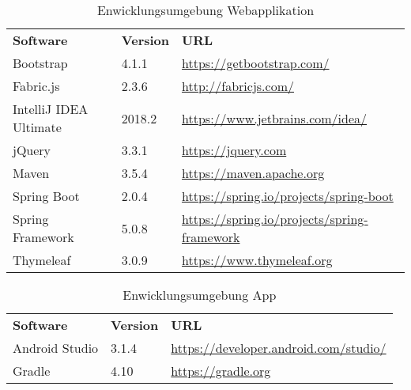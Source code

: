 \begin{table}[h]
	\centering
	\begin{tabularx}{\textwidth}{l l X}
		\rowcolor[HTML]{C0C0C0}
		\textbf{Software} & \textbf{Version} & \textbf{URL} \\
		Bootstrap & 4.1.1 &  \url{https://getbootstrap.com/} \\
		\rowcolor[HTML]{E7E7E7}
		Fabric.js & 2.3.6 &  \url{http://fabricjs.com/} \\
		IntelliJ IDEA Ultimate & 2018.2 & \url{https://www.jetbrains.com/idea/} \\		
		\rowcolor[HTML]{E7E7E7}
		jQuery & 3.3.1 &  \url{https://jquery.com} \\
		Maven & 3.5.4 & \url{https://maven.apache.org} \\
		\rowcolor[HTML]{E7E7E7}
		Spring Boot & 2.0.4 & \url{https://spring.io/projects/spring-boot} \\
		Spring Framework & 5.0.8 & \url{https://spring.io/projects/spring-framework} \\
		\rowcolor[HTML]{E7E7E7}
		Thymeleaf & 3.0.9 & \url{https://www.thymeleaf.org} \\
	\end{tabularx}
	\caption{Enwicklungsumgebung Webapplikation}
	\label{table:entwicklungsumgebung-server}
\end{table}

\begin{table}[h]
	\centering
	\begin{tabularx}{\textwidth}{l l X}
		\rowcolor[HTML]{C0C0C0}
		\textbf{Software} & \textbf{Version} & \textbf{URL} \\
		Android Studio & 3.1.4 & \url{https://developer.android.com/studio/} \\
		\rowcolor[HTML]{E7E7E7}
		Gradle & 4.10 & \url{https://gradle.org} \\
	\end{tabularx}
	\caption{Enwicklungsumgebung App}
	\label{table:entwicklungsumgebung-app}
\end{table}
